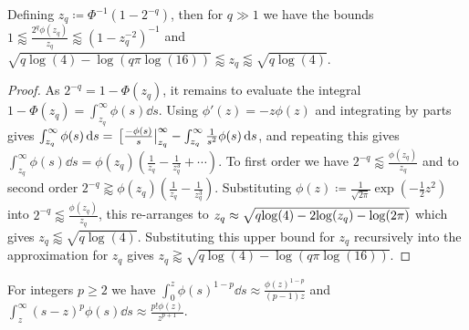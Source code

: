 \documentclass[manuscript,review]{acmart}
\begin{document}
\begin{lemma}
\label{lemma:approximate_tail_values}
Defining $ z_q \coloneqq \Phi^{-1}(1 - 2^{-q})$, then for $ q \gg 1 $ we have the bounds $ 1 \lessapprox \tfrac{2^q\phi(z_q)}{z_q} \lessapprox (1 - z_q^{-2})^{-1}$  and $ \sqrt{q \log(4) - \log(q \pi \log(16))} \lessapprox z_q  \lessapprox \sqrt{q \log(4)}$.
\end{lemma}

\begin{proof}
As $ 2^{-q} = 1 - \Phi(z_q) $, it remains to evaluate the integral $ 1 - \Phi(z_q) = \int_{z_q}^{\infty} \phi(s) \dd{s} $. Using $ \phi'(z) =  -z \phi(z) $ and integrating by parts gives $ \int_{z_q}^{\infty} \phi(s) \dd{s} = \eval*[\tfrac{-\phi(s)}{s}|_{z_q}^{\infty} - \int_{z_q}^{\infty} \tfrac{1}{s^2} \phi(s) \dd{s} $, and repeating this gives $ \int_{z_q}^{\infty} \phi(s) \dd{s}  = \phi(z_q)(\tfrac{1}{z_q} - \tfrac{1}{z_q^3} + \cdots) $. To first order we have $ 2^{-q} \lessapprox \tfrac{\phi(z_q)}{z_q} $ and to second order $ 2^{-q} \gtrapprox \phi(z_q)(\tfrac{1}{z_q} - \tfrac{1}{z_q^3}) $.  Substituting $ \phi(z) \coloneqq \tfrac{1}{\sqrt{2 \pi}} {\exp}(-\tfrac{1}{2}z^2) $ into $ 2^{-q} \lessapprox \tfrac{\phi(z_q)}{z_q} $, this re-arranges to $ z_q \approx \sqrt{q{\log}(4) - 2{\log}(\smash{z_q}) - {\log}(2\pi)} $ which gives $ z_q \lessapprox \sqrt{q \log(4)} $. Substituting this upper bound for $ z_q $ recursively into the approximation  for $ z_q $ gives $ z_q \gtrapprox  \sqrt{q \log(4) - \log(q \pi \log(16))}$. \qedhere
\end{proof}

\begin{lemma}
\label{lemma:approximate_moments}
For integers $ p \geq 2 $ we have $ \int_{0}^{z} \phi(s)^{1-p} \dd{s} \approx \tfrac{\phi(z)^{1-p}}{(p-1)z}  $ and $ \int_{z}^{\infty} (s-z)^p\phi(s) \dd{s} \approx \tfrac{p!\phi(z)}{z^{p+1}} $.
\end{lemma}
\end{document}
